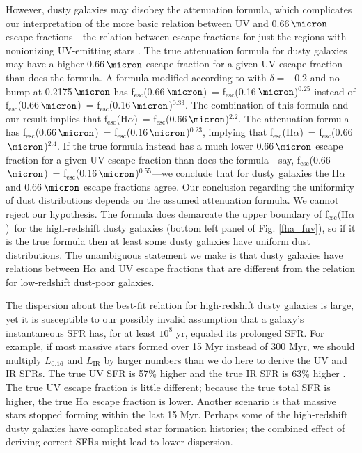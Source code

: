 \documentclass[preprint]{aastex}
\newcommand{\alephuv}{f$_{\mathrm{esc}}$(0.16$\,\micron$)}
\newcommand{\alephha}{f$_{\mathrm{esc}}$(H$\alpha$)}
\newcommand{\alephuvha}{f$_{\mathrm{esc}}$(0.66$\,\micron$)}
\begin{document}
However, dusty galaxies may disobey the \citet{calzetti00} attenuation
formula, which complicates our interpretation of the more basic relation
between UV and 0.66$\,\micron$ escape fractions---the relation between
escape fractions for just the regions with nonionizing UV-emitting stars
\citep{reddy10,reddy12,reddy15,buat11,buat12,penner12,kriek13}.  The true attenuation
formula for dusty galaxies may have a higher 0.66$\,\micron$ escape fraction
for a given UV escape fraction than does the \citet{calzetti00} formula.  A
formula modified according to
\citet{kriek13} with $\delta = -0.2$ and no bump at 0.2175$\,\micron$ has
\alephuvha~=
\alephuv$^{0.25}$ instead of \alephuvha~= \alephuv$^{0.33}$.  The combination of
this \citet{kriek13} formula and our result implies that
\alephha~= \alephuvha$^{2.2}$.  The \citet{reddy15} attenuation formula has
\alephuvha~= \alephuv$^{0.23}$, implying that \alephha~= \alephuvha$^{2.4}$.
If the true formula instead has a
much lower 0.66$\,\micron$ escape fraction for a given UV escape
fraction than does the \citet{calzetti00} formula---say, \alephuvha~=
\alephuv$^{0.55}$---we conclude that for dusty
galaxies the H$\alpha$ and 0.66$\,\micron$ escape fractions agree.  Our
conclusion regarding the uniformity of dust distributions depends on the
assumed attenuation formula.  We cannot reject our hypothesis.  The
\citet{calzetti00} formula does demarcate the upper boundary of \alephha~for the
high-redshift dusty galaxies (bottom left panel of Fig. \ref{fha_fuv}), so
if it is the true formula then at least some dusty galaxies have uniform
dust distributions.  The unambiguous statement we make is that dusty galaxies
have relations between H$\alpha$ and UV escape fractions that are different from
the relation for low-redshift dust-poor galaxies.

The dispersion about the best-fit relation for high-redshift dusty galaxies
is large, yet it is susceptible
to our possibly invalid assumption that a galaxy's instantaneous SFR has,
for at least $10^{8}$ yr, equaled its prolonged SFR.  For example, if most
massive stars formed over 15 Myr instead of 300 Myr, we should multiply
$L_{0.16}$ and $L_{\mathrm{IR}}$ by larger numbers than we do here to derive the
UV and IR SFRs.  The true UV SFR is 57\% higher and the true IR SFR is 63\%
higher \citep{madau14}.  The true UV escape fraction is little different;
because the true total SFR is higher, the true H$\alpha$ escape fraction is
lower.  Another scenario is that massive stars stopped forming within the last
15 Myr.  Perhaps some of the high-redshift dusty galaxies have
complicated star formation histories; the combined effect of deriving correct
SFRs might lead to lower dispersion.
\end{document}
